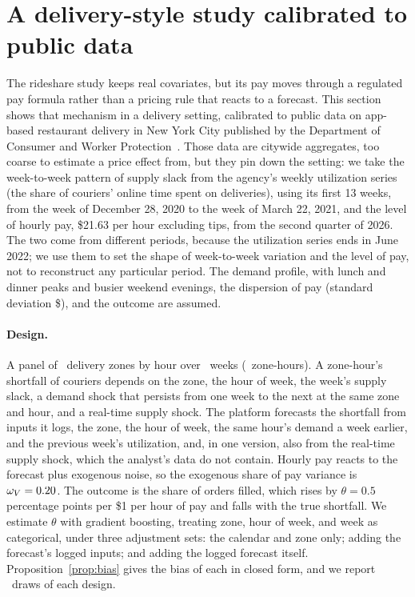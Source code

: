 \documentclass[11pt]{article}
\theoremstyle{remark}
\begin{document}
\section{A delivery-style study calibrated to public data}
\label{sec:delivery}

The rideshare study keeps real covariates, but its pay moves through a regulated pay formula rather than a pricing rule that reacts to a forecast. This section shows that mechanism in a delivery setting, calibrated to public data on app-based restaurant delivery in New York City published by the Department of Consumer and Worker Protection~\citep{dcwp2026report, dcwp2026data}. Those data are citywide aggregates, too coarse to estimate a price effect from, but they pin down the setting: we take the week-to-week pattern of supply slack from the agency's weekly utilization series (the share of couriers' online time spent on deliveries), using its first 13 weeks, from the week of December 28, 2020 to the week of March 22, 2021, and the level of hourly pay, \$21.63 per hour excluding tips, from the second quarter of 2026. The two come from different periods, because the utilization series ends in June 2022; we use them to set the shape of week-to-week variation and the level of pay, not to reconstruct any particular period. The demand profile, with lunch and dinner peaks and busier weekend evenings, the dispersion of pay (standard deviation \$\DelPaySD), and the outcome are assumed.

\paragraph{Design.} A panel of \DelZones\ delivery zones by hour over \DelWeeks\ weeks (\DelN\ zone-hours). A zone-hour's shortfall of couriers depends on the zone, the hour of week, the week's supply slack, a demand shock that persists from one week to the next at the same zone and hour, and a real-time supply shock. The platform forecasts the shortfall from inputs it logs, the zone, the hour of week, the same hour's demand a week earlier, and the previous week's utilization, and, in one version, also from the real-time supply shock, which the analyst's data do not contain. Hourly pay reacts to the forecast plus exogenous noise, so the exogenous share of pay variance is $\omega_V = 0.20$. The outcome is the share of orders filled, which rises by $\theta = 0.5$ percentage points per \$1 per hour of pay and falls with the true shortfall. We estimate $\theta$ with gradient boosting, treating zone, hour of week, and week as categorical, under three adjustment sets: the calendar and zone only; adding the forecast's logged inputs; and adding the logged forecast itself. Proposition~\ref{prop:bias} gives the bias of each in closed form, and we report \DelDraws\ draws of each design.
\end{document}
